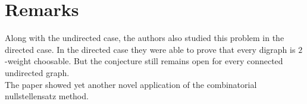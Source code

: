 \section{Remarks}
Along with the undirected case, the authors also studied this problem in the directed case. In the directed case they were able to prove that every digraph is $2$-weight choosable. But the conjecture still remains open for every connected undirected graph.
\\
The paper showed yet another novel application of the combinatorial nullstellensatz method. 